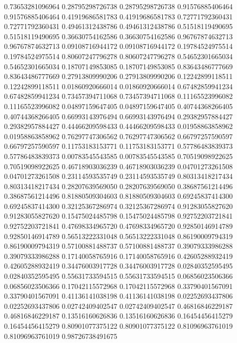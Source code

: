    0.73653281096964   0.28795298726738
   0.28795298726738   0.91576885406464
   0.91576885406464   0.41919686581783
   0.41919686581783   0.72771792360431
   0.72771792360431   0.49461312438786
   0.49461312438786   0.51518119490695
   0.51518119490695   0.36630754162586
   0.36630754162586   0.96767874632713
   0.96767874632713   0.09108716944172
   0.09108716944172   0.19784524975514
   0.19784524975514   0.80607247796278
   0.80607247796278   0.54652301665034
   0.54652301665034   0.18707149853085
   0.18707149853085   0.83643486777669
   0.83643486777669   0.27913809990206
   0.27913809990206   0.12242899118511
   0.12242899118511   0.01860920666014
   0.01860920666014   0.67482859941234
   0.67482859941234   0.73457394711068
   0.73457394711068   0.11165523996082
   0.11165523996082   0.04897159647405
   0.04897159647405   0.40744368266405
   0.40744368266405   0.66993143976494
   0.66993143976494   0.29382957884427
   0.29382957884427   0.44466209598433
   0.44466209598433   0.01958863858962
   0.01958863858962   0.76297747306562
   0.76297747306562   0.66797257590597
   0.66797257590597   0.11753183153771
   0.11753183153771   0.57786483839373
   0.57786483839373   0.00783545543585
   0.00783545543585   0.70519098922625
   0.70519098922625   0.46718903036239
   0.46718903036239   0.04701273261508
   0.04701273261508   0.23114593535749
   0.23114593535749   0.80313418217434
   0.80313418217434   0.28207639569050
   0.28207639569050   0.38687561214496
   0.38687561214496   0.81880509304603
   0.81880509304603   0.69245837414300
   0.69245837414300   0.32125367286974
   0.32125367286974   0.91283055827620
   0.91283055827620   0.15475024485798
   0.15475024485798   0.92752203721841
   0.92752203721841   0.47698334965720
   0.47698334965720   0.92850146914789
   0.92850146914789   0.56513222331048
   0.56513222331048   0.86190009794319
   0.86190009794319   0.57100881488737
   0.57100881488737   0.39079333986288
   0.39079333986288   0.17140058765916
   0.17140058765916   0.42605288932419
   0.42605288932419   0.34476003917728
   0.34476003917728   0.02840352595495
   0.02840352595495   0.55631733594515
   0.55631733594515   0.06856023506366
   0.06856023506366   0.17042115572968
   0.17042115572968   0.33790401567091
   0.33790401567091   0.41136141038198
   0.41136141038198   0.02252693437806
   0.02252693437806   0.02742409402547
   0.02742409402547   0.46816846229187
   0.46816846229187   0.13516160626836
   0.13516160626836   0.16454456415279
   0.16454456415279   0.80901077375122
   0.80901077375122   0.81096963761019
   0.81096963761019   0.98726738491675
